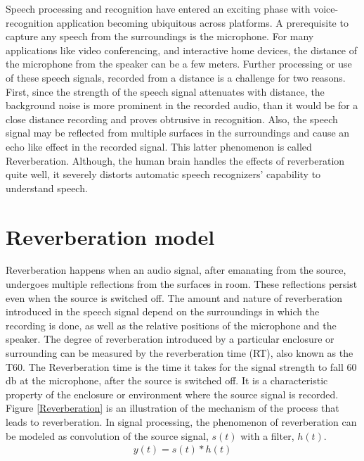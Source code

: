 \documentclass[12pt, a4paper, oneside]{book}
\begin{document}
Speech processing and recognition have entered an exciting phase with voice-recognition application becoming ubiquitous across platforms. A prerequisite to capture any speech from the surroundings is the microphone. For many applications like video conferencing, and interactive home devices, the distance of the microphone from the speaker can be a few meters. Further processing or use of these speech signals, recorded from a distance is a challenge for two reasons. First, since the strength of the speech signal attenuates with distance, the background noise is more prominent in the recorded audio, than it would be for a close distance recording and proves obtrusive in recognition. Also, the speech signal may be reflected from multiple surfaces in the surroundings and cause an echo like effect in the recorded signal. This latter phenomenon is called Reverberation. Although, the human brain handles the effects of reverberation quite well, it severely distorts automatic speech recognizers’ capability to understand speech. \\

\section{Reverberation model}
Reverberation happens when an audio signal, after emanating from the source, undergoes multiple reflections from the surfaces in room. These reflections persist even when the source is switched off. The amount and nature of reverberation introduced in the speech signal depend on the surroundings in which the recording is done, as well as the relative positions of the microphone and the speaker. The degree of reverberation introduced by a particular enclosure or surrounding can be measured by the reverberation time (RT), also known as the T60. The Reverberation time is the time it takes for the signal strength to fall 60 db at the microphone, after the source is switched off. It is a characteristic property of the enclosure or environment where the source signal is recorded. Figure \ref{Reverberation} is an illustration of the mechanism of the process that leads to reverberation. In signal processing, the phenomenon of reverberation can be modeled as convolution of the source signal, $s(t)$ with a filter, $h(t)$.
\begin{align}
y(t) = s(t)*h(t) \label{eq :1}
\end{align}
\end{document}
